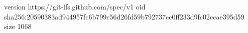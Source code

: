 version https://git-lfs.github.com/spec/v1
oid sha256:20590383ad944957fc6b799c56d26fd59b792737cc0ff233d9fc02ccae395d59
size 1068
